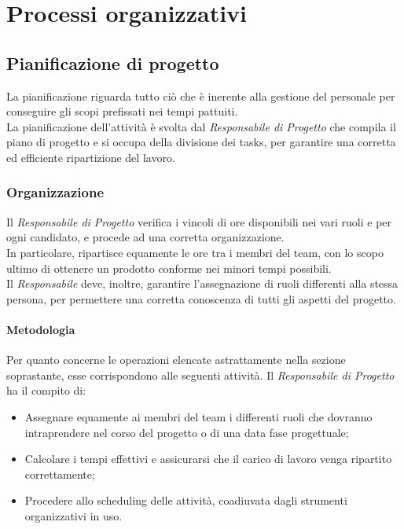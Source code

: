 \newpage

\section{Processi organizzativi}

	\subsection{Pianificazione di progetto}
	La pianificazione riguarda tutto ciò che è inerente alla gestione del personale per conseguire gli scopi prefissati nei tempi pattuiti.\\
	La pianificazione dell'attività è svolta dal \textit{Responsabile di Progetto} che compila il piano di progetto e si occupa della divisione dei tasks, per garantire una corretta ed efficiente ripartizione del lavoro.
		\subsubsection{Organizzazione}
		Il \textit{Responsabile di Progetto} verifica i vincoli di ore disponibili nei vari ruoli e per ogni candidato, e procede ad una corretta organizzazione.\\
		In particolare, ripartisce equamente le ore tra i membri del team, con lo scopo ultimo di ottenere un prodotto conforme nei minori tempi possibili.\\
		Il \textit{Responsabile} deve, inoltre, garantire l'assegnazione di ruoli differenti alla stessa persona, per permettere una corretta conoscenza di tutti gli aspetti del progetto.
		
		\paragraph{Metodologia}
		Per quanto concerne le operazioni elencate astrattamente nella sezione soprastante, esse corrispondono alle seguenti attività. Il \textit{Responsabile di Progetto} ha il compito di:
		\begin{itemize}
			\item Assegnare equamente ai membri del team i differenti ruoli che dovranno intraprendere nel corso del progetto o di una data fase progettuale;
			\item Calcolare i tempi effettivi e assicurarsi che il carico di lavoro venga ripartito correttamente;
			\item Procedere allo scheduling delle attività, coadiuvata dagli strumenti organizzativi in uso.
		\end{itemize}
	
